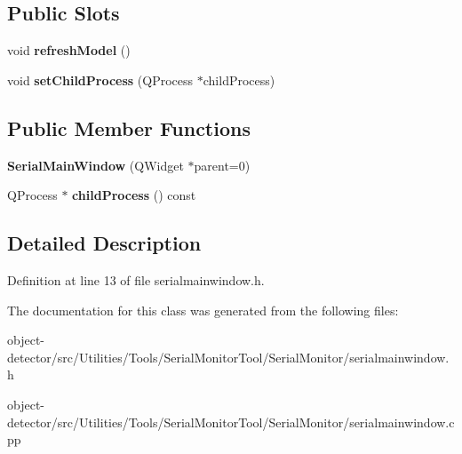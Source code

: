 \subsection*{Public Slots}
\begin{DoxyCompactItemize}
\item 
\mbox{\label{class_serial_main_window_ae308fe3948cbbc30e8a5ab16b8c97de8}} 
void {\bfseries refresh\+Model} ()
\item 
\mbox{\label{class_serial_main_window_ab650cccd2dbbb8ff07ccf3fab3dedd83}} 
void {\bfseries set\+Child\+Process} (Q\+Process $\ast$child\+Process)
\end{DoxyCompactItemize}
\subsection*{Public Member Functions}
\begin{DoxyCompactItemize}
\item 
\mbox{\label{class_serial_main_window_a276b8efd0de7b56e2b6f0100c5e179ae}} 
{\bfseries Serial\+Main\+Window} (Q\+Widget $\ast$parent=0)
\item 
\mbox{\label{class_serial_main_window_a2be47bda6a0b2a5ab25d7df79a1597e8}} 
Q\+Process $\ast$ {\bfseries child\+Process} () const
\end{DoxyCompactItemize}


\subsection{Detailed Description}


Definition at line 13 of file serialmainwindow.\+h.



The documentation for this class was generated from the following files\+:\begin{DoxyCompactItemize}
\item 
object-\/detector/src/\+Utilities/\+Tools/\+Serial\+Monitor\+Tool/\+Serial\+Monitor/serialmainwindow.\+h\item 
object-\/detector/src/\+Utilities/\+Tools/\+Serial\+Monitor\+Tool/\+Serial\+Monitor/serialmainwindow.\+cpp\end{DoxyCompactItemize}
